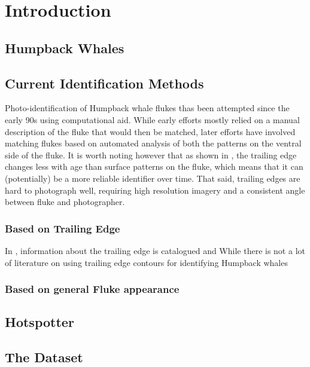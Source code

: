  
\chapter{Introduction} \label{sec:introduction}
 
\section{Humpback Whales}

\section{Current Identification Methods}

Photo-identification of Humpback whale flukes thas been attempted since the early 90s \cite{mizroch1990computer} using computational aid.
While early efforts mostly relied on a manual description of the fluke that would then be matched, later efforts have involved matching flukes based on automated analysis of both the patterns on the ventral side of the fluke.
It is worth noting however that as shown in \cite{blackmer2000temporal}, the trailing edge changes less with age than surface patterns on the fluke, which means that it can (potentially) be a more reliable identifier over time.
That said, trailing edges are hard to photograph well, requiring high resolution imagery and a consistent angle between fluke and photographer.

\subsection{Based on Trailing Edge}

In \cite{mizroch1990computer}, information about the trailing edge is catalogued and 
While there is not a lot of literature on using trailing edge contours for identifying Humpback whales


\subsection{Based on general Fluke appearance}


\section{Hotspotter}

\section{The Dataset}


